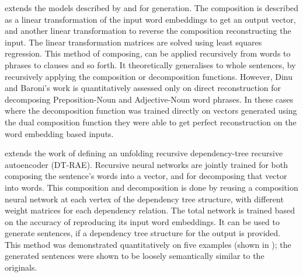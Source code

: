 \documentclass[compsoc]{IEEEtran}
\theoremstyle{plain}
\theoremstyle{definition}
\begin{document}
\textcite{Dinu2014CompositionalGeneration}  extends the models described by \textcite{zanzotto2010estimating} and \textcite{Guevara2010} for generation. The composition is described as a linear transformation of the input word embeddings to get an output vector, and another linear transformation to reverse the composition reconstructing the input. The linear transformation matrices are solved using least squares regression. This method of composing, can be applied recursively from words to phrases to clauses and so forth.
It theoretically generalises to whole sentences, by recursively applying the composition or decomposition functions. However, Dinu and Baroni's work is quantitatively assessed only on direct reconstruction for decomposing Preposition-Noun and Adjective-Noun word phrases. In these cases where the decomposition function was trained directly on vectors generated using the dual composition function they were able to get perfect reconstruction on the word embedding based inputs.


\textcite{iyyer2014generating} extends the work of \textcite{SocherEtAl2011:PoolRAE} defining an unfolding recursive dependency-tree recursive autoencoder (DT-RAE). Recursive neural networks are jointly trained for both composing the sentence's words into a vector, and for decomposing that vector into words. This composition and decomposition is done by reusing a composition neural network at each vertex of the  dependency tree structure, with different weight matrices for each dependency relation. The total network is trained based on the accuracy of reproducing its input word embeddings. It can be used to generate sentences, if a dependency tree structure for the output is provided. This method was demonstrated quantitatively on five examples (shown in ); the generated sentences were shown to be loosely semantically similar to the originals.

\end{document}
